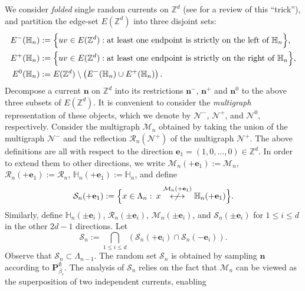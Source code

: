 \documentclass[11pt,a4paper]{article}
\numberwithin{equation}{section}
\theoremstyle{plain}
\theoremstyle{definition}
\newcommand\n{\mathbf{n}}
\begin{document}
We consider \emph{folded} single random currents on $\mathbb Z^d$ (see \cite{aizenman2025geometric} for a review of this ``trick''), and partition the edge-set $E(\mathbb Z^d)$ into three disjoint sets:
\begin{align*}
    E^{-}(\mathbb H_n)&:=\Big\{ uv\in E(\mathbb Z^d) :\textup{at least one endpoint is strictly on the left of $\mathbb H_n$}\Big\},\\
    E^{+}(\mathbb H_n)&:=\Big\{ uv\in E(\mathbb Z^d) :\textup{at least one endpoint is strictly on the right of $\mathbb H_n$}\Big\},\\
    E^{0}(\mathbb H_n)&:=E(\mathbb Z^d)\setminus\left(E^{-}(\mathbb H_n)\cup E^{+}(\mathbb H_n)\right).
\end{align*}
Decompose a current $\n$ on $\mathbb Z^d$ into its restrictions $\n^{-}$, $\n^{+}$ and $\n^0$ to the above three subsets of $E(\mathbb Z^d)$. It is convenient to consider the \emph{multigraph} representation of these objects, which we denote by $\mathcal N^-$, $\mathcal N^+$, and $\mathcal N^0$, respectively. Consider the multigraph $\mathcal{M}_n$
 obtained by taking the union of the multigraph $\mathcal{N}^{-}$ and the reflection $\mathcal{R}_n(\mathcal{N}^+)$ of the multigraph $\mathcal{N}^+$. The above definitions are all with respect to the direction $\mathbf e_1=(1,0,\ldots,0)\in \mathbb Z^d$. In order to extend them to other directions, we write $\mathcal{M}_n(+\mathbf{e}_1):=\mathcal{M}_n$, $\mathcal R_n(+\mathbf{e}_1):=\mathcal R_n$, $\mathbb H_n(+\mathbf{e}_1):=\mathbb H_n$, and define
\begin{equation}
   \mathcal{S}_n(+\mathbf{e}_1):=\Big\lbrace x\in \Lambda_n: \: x \overset{\mathcal M_n(+\mathbf e_1)}{\centernot\longleftrightarrow} \mathbb H_n(+\mathbf{e}_1)\Big\rbrace.\end{equation}
\noindent Similarly, define $\mathbb H_n(\pm \mathbf{e}_i)$, $\mathcal R_n(\pm \mathbf{e}_i)$, $\mathcal{M}_n(\pm \mathbf{e}_i)$, and $\mathcal{S}_n(\pm\mathbf{e}_i)$ for $1\leq i \leq d$ in the other $2d-1$ directions. Let
\begin{equation}\label{eq:def S_n}
    \mathcal{S}_n:=\bigcap_{1\leq i \leq d}\left(\mathcal{S}_n(+\mathbf{e}_i)\cap \mathcal{S}_n(-\mathbf{e}_i)\right).
\end{equation}
Observe that $\mathcal S_n\subset \Lambda_{n-1}$.
The random set $\mathcal S_n$ is obtained by sampling $\n$ according to $\mathbf P_{\beta_c}^\emptyset$. The analysis of $\mathcal{S}_n$ relies on the fact that $\mathcal{M}_n$ 
can be viewed as the superposition of two independent currents, enabling 
\end{document}
